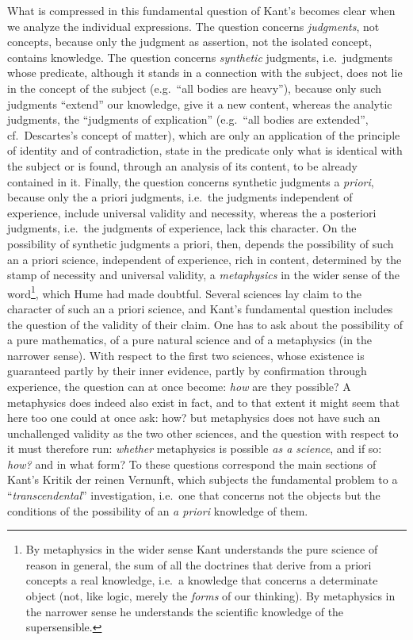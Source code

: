 What is compressed in this fundamental question of Kant's becomes clear
when we analyze the individual expressions. The question concerns
\emph{judgments}, not concepts, because only the judgment as assertion,
not the isolated concept, contains knowl\setcounter{footnote}{0}edge.
The question concerns \emph{synthetic} judgments, i.e.\ judgments whose
predicate, although it stands in a connection with the subject, does
not lie in the concept of the subject (e.g.\ ``all bodies are
heavy''), because only such judgments ``extend'' our knowledge, give it
a new content, whereas the analytic judgments, the ``judgments of
explication'' (e.g.\ ``all bodies are extended'', cf.\ Descartes's
concept of matter), which are only an application of the principle of
identity and of contradiction, state in the predicate only what is
identical with the subject or is found, through an analysis of its
content, to be already contained in it. Finally, the question concerns
synthetic judgments a \emph{priori}, because only the a priori
judgments, i.e.\ the judgments independent of experience, include
universal validity and necessity, whereas the a posteriori judgments,
i.e.\ the judgments of experience, lack this character. On the
possibility of synthetic judgments a priori, then, depends the
possibility of such an a priori science, independent of experience,
rich in content, determined by the stamp of necessity and universal
validity, a \emph{metaphysics} in the wider sense of the
word\footnote{By metaphysics in the wider sense Kant understands the
pure science of reason in general, the sum of all the doctrines that
derive from a priori concepts a real knowledge, i.e.\ a knowledge that
concerns a determinate object (not, like logic, merely the \emph{forms}
of our thinking). By metaphysics in the narrower sense he understands
the scientific knowledge of the supersensible.}, which Hume had made
doubtful. Several sciences lay claim to the character of such an a
priori science, and Kant's fundamental question includes the question
of the validity of their claim. One has to ask about the possibility of
a pure mathematics, of a pure natural science and of a metaphysics (in
the narrower sense). With respect to the first two sciences, whose
existence is guaranteed partly by their inner evidence, partly by
confirmation through experience, the question can at once become:
\emph{how} are they possible? A metaphysics does indeed also exist in
fact, and to that extent it might seem that here too one could at once
ask: how? but metaphysics does not have such an unchallenged
validity as the two other sciences, and the question with respect to it
must therefore run: \emph{whether} metaphysics is possible \emph{as a
science}, and if so: \emph{how?} and in what form? To these questions
correspond the main sections of Kant's Kritik der reinen Vernunft,
which subjects the fundamental problem to a ``\emph{transcendental}''
investigation, i.e.\ one that concerns not the objects but the
conditions of the possibility of an \emph{a priori} knowledge of them.

